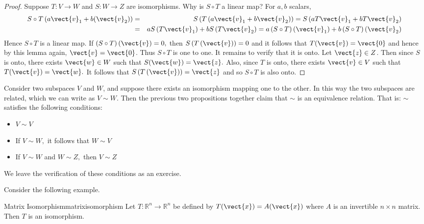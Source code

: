 \begin{proof}
Suppose $T:V\rightarrow W$ and  $S:W\rightarrow Z$ are isomorphisms. Why is $S\circ T$ a linear map?
For $a,b$ scalars,
\begin{eqnarray*}
S\circ T\left( a\vect{v}_{1}+b(\vect{v}_{2})\right) 
&=& S\left( T\left(a\vect{v}_{1}+b\vect{v}_{2}\right) \right) =S\left( aT\vect{v}_{1}+bT\vect{v}_{2}\right) \\
&=&aS\left( T\vect{v}_{1}\right) +bS\left( T\vect{v}_{2}\right) = a\left( S\circ
T\right) \left( \vect{v}_{1}\right) +b\left( S\circ T\right) \left( \vect{v}_{2}\right)
\end{eqnarray*}
Hence $S\circ T$ is a linear map. If $\left( S\circ T\right) \left( \vect{v} \right)
=0,$ then $S\left( T\left(  \vect{v} \right) \right) =0$ and it follows that $T(\vect{v})=\vect{0}$ and hence by this lemma again, $\vect{v}=\vect{0}$. Thus $S\circ
T $ is one to one. It remains to verify that it is onto. Let $\vect{z} \in Z$. Then
since $S$ is onto, there exists $\vect{w} \in W$ such that $S(\vect{w})=\vect{z}.$ Also, since $T$
is onto, there exists $\vect{v}\in V$ such that $T(\vect{v})=\vect{w}.$ It follows that $S\left(
T\left( \vect{v}\right) \right) =\vect{z}$ and so $S\circ T$ is also onto.
\end{proof}

Consider two subspaces $V$ and $W$, and suppose there exists an isomorphism mapping one to the other. In this way the two subspaces are related, which we can write as $V \sim W$. Then the previous two propositions together claim that $\sim $ is an equivalence relation. That is: $\sim $
satisfies the following conditions:

\begin{itemize}
\item $V\sim V$

\item If $V\sim W,$ it follows that $W\sim V$

\item If $V\sim W$ and $W\sim Z,$ then $V\sim Z$
\end{itemize}

We leave the verification of these conditions as an exercise.

Consider the following example. 

\begin{example}{Matrix Isomorphism}{matrixisomorphism}
Let $T:\mathbb{R}^{n}\rightarrow \mathbb{R}^{n}$ be defined by $T(\vect{x}) = A(\vect{x})$ where $A$ is an invertible $n\times n$ matrix. Then $T$ is
an isomorphism.
\end{example}

